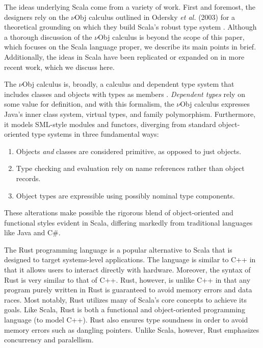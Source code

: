\documentclass[jou,apacite]{IEEEtran}
\begin{document}
The ideas underlying Scala come from a variety of work. First and foremost, the
designers rely on the $\nu$Obj calculus outlined in Odersky \emph{et al.}
(2003) for a theoretical grounding on which they build Scala's robust type
system \cite{odersky_nominal_2003}. Although a thorough discussion of the
$\nu$Obj calculus is beyond the scope of this paper, which focuses on the Scala
language proper, we describe its main points in brief. Additionally, the ideas
in Scala have been replicated or expanded on in more recent work, which we
discuss here.

The $\nu$Obj calculus is, broadly, a calculus and dependent type system that
includes classes and objects with types as members
\cite{odersky_nominal_2003}. \emph{Dependent types} rely on some value for
definition, and with this formalism, the $\nu$Obj calculus expresses Java's
inner class system, virtual types, and family polymorphism. Furthermore, it
models SML-style modules and functors, diverging from standard object-oriented
type systems in three fundamental ways:
\begin{enumerate}
\item Objects \emph{and} classes are considered primitive, as opposed to just
  objects.
\item Type checking and evaluation rely on name references rather than object
  records.                     %
\item Object types are expressible using possibly nominal type components.
\end{enumerate}
These alterations make possible the rigorous blend of object-oriented and
functional styles evident in Scala, differing markedly from traditional
languages like Java and C\#.

The Rust programming language is a popular alternative to Scala that is
designed to target systems-level applications. The 
language is similar to C++ in that it allows users to interact directly 
with hardware. Moreover, the syntax of Rust is very similar to that of C++. 
Rust, however, is unlike C++ in that any program purely written
in Rust is guaranteed to avoid memory errors and data races.
Most notably, Rust utilizes many of Scala's core concepts to achieve its goals.
Like Scala, Rust is both a functional and object-oriented programming language
(to model C++). Rust also ensures type soundness in order to avoid memory errors
such as dangling pointers. Unlike Scala, however, Rust emphasizes 
concurrency and paralellism.
\end{document}
